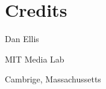 \begin{comment}
\documentclass[10pt]{article}
\usepackage{fullpage, graphicx, url}
\setlength{\parskip}{1ex}
\setlength{\parindent}{0ex}
\title{Credits}



\begin{tabular}{ccc}
The Alternative Csound Reference Manual & & \\
Previous &The Utility Programs &Next

\end{tabular}

\end{comment}
\section{Credits}


 Dan Ellis


 MIT Media Lab


 Cambrige, Massachussetts


\begin{comment}
\begin{tabular}{lcr}
Previous &Home &Next \\
Soundfile Formats. &Up &Analysis File Generation

\end{tabular}



\end{comment}
